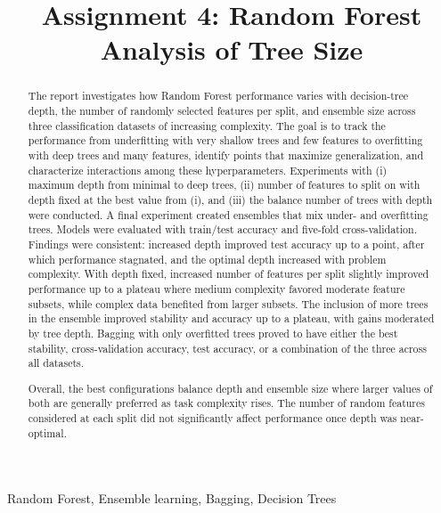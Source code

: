 \documentclass[conference]{IEEEtran}
\begin{document}
\title{Assignment 4: Random Forest Analysis of Tree Size}

\author{
}

\maketitle


\begin{abstract}
The report investigates how Random Forest performance varies with decision-tree depth, the number of randomly selected features per split, and ensemble size across three classification datasets of increasing complexity. The goal is to track the performance from underfitting with very shallow trees and few features to overfitting with deep trees and many features, identify points that maximize generalization, and characterize interactions among these hyperparameters. Experiments with (i) maximum depth from minimal to deep trees, (ii) number of features to split on with depth fixed at the best value from (i), and (iii) the balance number of trees with depth were conducted. A final experiment created ensembles that mix under- and overfitting trees. Models were evaluated with train/test accuracy and five-fold cross-validation. Findings were consistent: increased depth improved test accuracy up to a point, after which performance stagnated, and the optimal depth increased with problem complexity. With depth fixed, increased number of features per split slightly improved performance up to a plateau where medium complexity favored moderate feature subsets, while complex data benefited from larger subsets. The inclusion of more trees in the ensemble improved stability and accuracy up to a plateau, with gains moderated by tree depth. Bagging with only overfitted trees proved to have either the best stability, cross-validation accuracy, test accuracy, or a combination of the three across all datasets.

  Overall, the best configurations balance depth and ensemble size where larger values of both are generally preferred as task complexity rises. The number of random features considered at each split did not significantly affect performance once depth was near-optimal.
\end{abstract}


\begin{IEEEkeywords}
Random Forest, Ensemble learning, Bagging, Decision Trees
\end{IEEEkeywords}
\end{document}

